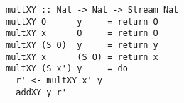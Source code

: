 \begin{figure}[!t]
  \centering
  \begin{minipage}{\columnwidth}
    \begin{lstlisting}[label={mult_fast}, caption={Efficient implementation of \lstinline{multo in in out} direciton}, captionpos=b, frame=tb]
multXY :: Nat -> Nat -> Stream Nat
multXY O      y     = return O
multXY x      O     = return O
multXY (S O)  y     = return y
multXY x      (S O) = return x
multXY (S x') y     = do
  r' <- multXY x' y
  addXY y r'
    \end{lstlisting}
  \end{minipage}
\end{figure}
